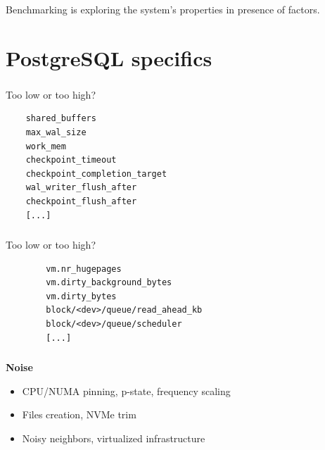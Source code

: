 \documentclass[usenames,dvipsnames, 18pt, compress, aspectratio=169]{beamer}
\begin{document}
\begin{frame}
    \frametitle{}
    \begin{center}
        Benchmarking is exploring the system's {{\bf {}}}
        properties in presence of {\bf {}} factors.

    \end{center}
\end{frame}

\section{PostgreSQL specifics}

\begin{frame}[fragile]{}
    \frametitle{}
    \begin{center}
        Too low or too high?

        \begin{verbatim}
    shared_buffers
    max_wal_size
    work_mem
    checkpoint_timeout
    checkpoint_completion_target
    wal_writer_flush_after
    checkpoint_flush_after
    [...]
        \end{verbatim}

    \end{center}
\end{frame}

\begin{frame}[fragile]{}
    \frametitle{}
    \begin{center}
        Too low or too high?

        \begin{verbatim}
        vm.nr_hugepages
        vm.dirty_background_bytes
        vm.dirty_bytes
        block/<dev>/queue/read_ahead_kb
        block/<dev>/queue/scheduler
        [...]
        \end{verbatim}
    \end{center}
\end{frame}

\begin{frame}
    \frametitle{}
    \begin{center}
        \textbf{Noise}

        \vspace{0.5cm}
        \begin{itemize}
            \item CPU/NUMA pinning, p-state, frequency scaling
            \item Files creation, NVMe trim
            \item Noisy neighbors, virtualized infrastructure
        \end{itemize}
    \end{center}
\end{frame}
\end{document}

